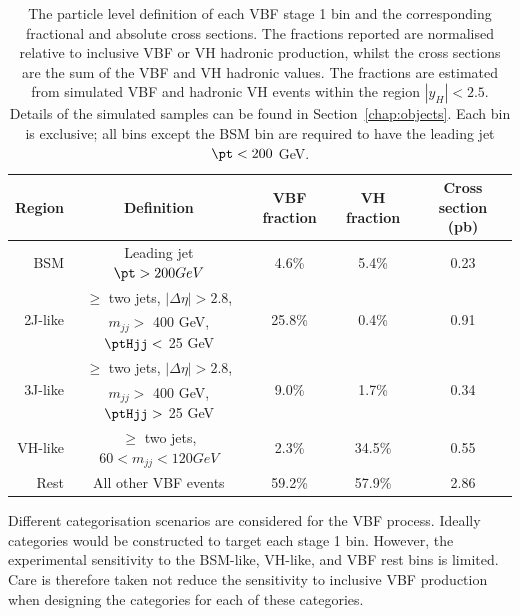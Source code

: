 \begin{table}
  \begin{centering}
    \begin{tabular}{ r | c | c | c | c } 
    \hline
    Region & Definition & VBF fraction & VH fraction & Cross section (pb) \\ 
    \hline
    BSM                      & Leading jet $\pt > 200 GeV$             &  4.6\%                  & 5.4\%                   & 0.23                  \\ 
    \hline
    \multirow{2}{*}{2J-like} & $\ge$ two jets, $|\Delta\eta| > 2.8$,     & \multirow{2}{*}{25.8\%} & \multirow{2}{*}{0.4\%}  & \multirow{2}{*}{0.91} \\
                             & $m_{jj} >$ 400 GeV, $\ptHjj <$ 25 GeV    &                         &                         &                       \\
    \hline
    \multirow{2}{*}{3J-like} & $\ge$ two jets, $|\Delta\eta| > 2.8$,     & \multirow{2}{*}{9.0\%} & \multirow{2}{*}{1.7\%}  & \multirow{2}{*}{0.34} \\ 
                             & $m_{jj} >$ 400 GeV, $\ptHjj >$ 25 GeV    &                         &                         &                       \\
    \hline
    VH-like                  & $\ge$ two jets, $60 < m_{jj} < 120 GeV$ &  2.3\%                  & 34.5\%                  & 0.55 \\
    \hline
    Rest                     & All other VBF events                     & 59.2\%                  & 57.9\%                  & 2.86 \\ 
    \hline
    \end{tabular}
    \caption{The particle level definition of each VBF stage 1 bin 
    and the corresponding fractional and absolute cross sections.
    The fractions reported are normalised relative to inclusive VBF or VH hadronic production, 
    whilst the cross sections are the sum of the VBF and VH hadronic values.
    The fractions are estimated from simulated VBF and hadronic VH \Hgg events 
    within the region $|y_H| < 2.5$.
    Details of the simulated samples can be found in Section~\ref{chap:objects}.
    Each bin is exclusive; all bins except the BSM bin 
    are required to have the leading jet $\pt < 200$ GeV.
    }
    \label{tab:cat_VBFfractions}
  \end{centering}
\end{table}

Different categorisation scenarios are considered for the VBF process.
Ideally categories would be constructed to target each stage 1 bin.
However, the experimental sensitivity to the BSM-like, VH-like, and VBF rest bins is limited.
Care is therefore taken not reduce the sensitivity to inclusive VBF production when designing 
the categories for each of these categories.

